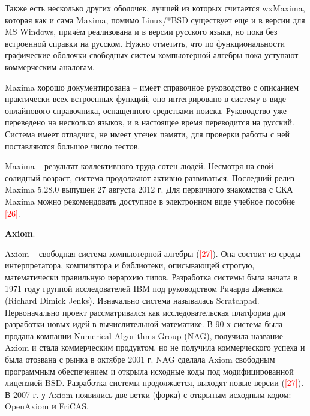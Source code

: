 Также есть несколько других оболочек, лучшей из которых считается wxMaxima, которая как и сама Maxima, помимо Linux/*BSD существует еще и в версии для MS Windows, причём реализована и в версии русского языка, но пока без встроенной справки на русском. Нужно отметить, что по функциональности графические оболочки свободных систем компьютерной алгебры пока уступают коммерческим аналогам.

Maxima хорошо документирована -- имеет справочное руководство с описанием практически всех встроенных функций, оно интегрировано в систему в виде онлайнового справочника, оснащенного средствами поиска. Руководство уже переведено на несколько языков, и в настоящее время переводится на русский. Система имеет отладчик, не имеет утечек памяти, для проверки работы с ней поставляются большое число тестов.

Maxima -- результат коллективного труда сотен людей. Несмотря на свой солидный возраст, система продолжают активно развиваться. Последний релиз Maxima 5.28.0 выпущен 27 августа 2012 г. Для первичного знакомства с СКА Maxima можно рекомендовать доступное в электронном виде учебное пособие \textcolor{red}{[26]}.

\textbf{Axiom}.

Axiom -- свободная система компьютерной алгебры (\textcolor{red}{[27]}). Она состоит из среды интерпретатора, компилятора и библиотеки, описывающей строгую, математически правильную иерархию типов. Разработка системы была начата в 1971 году группой исследователей IBM под руководством Ричарда Дженкса (Richard Dimick Jenks). Изначально система называлась Scratchpad. Первоначально проект рассматривался как исследовательская платформа для разработки новых идей в вычислительной математике. В 90-х система была продана компании Numerical Algorithms Group (NAG), получила название Axiom и стала коммерческим продуктом, но не получила коммерческого успеха и была отозвана с рынка в октябре 2001 г. NAG сделала Axiom свободным программным обеспечением и открыла исходные коды под модифицированной лицензией BSD. Разработка системы продолжается, выходят новые версии (\textcolor{red}{[27]}). В 2007 г. у Axiom появились две ветки (форка) с открытым исходным кодом: OpenAxiom и FriCAS.

